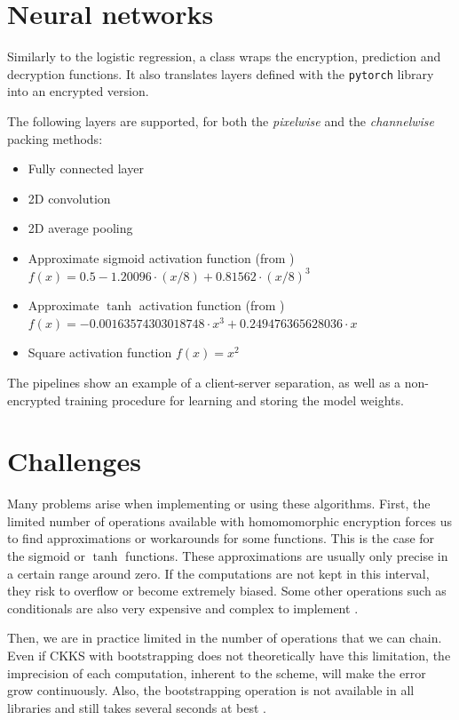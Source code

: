 \documentclass[a4paper,11pt,oneside]{report}
\begin{document}
\section{Neural networks}

Similarly to the logistic regression, a class wraps the encryption, prediction and decryption functions. 
It also translates layers defined with the \texttt{pytorch} library into an encrypted version.

The following layers are supported, for both the \emph{pixelwise} and the \emph{channelwise} packing methods:
\begin{itemize}
  \item Fully connected layer
  \item 2D convolution
  \item 2D average pooling
  \item Approximate sigmoid activation function (from \cite{kim_logistic_2018}) \\ $f(x) = 0.5 - 1.20096 \cdot (x/8) + 0.81562 \cdot (x/8)^3$ 
  \item Approximate $\tanh$ activation function (from \cite{podschwadt_classification_2020}) \\ $f(x) = -0.00163574303018748 \cdot x^3 + 0.249476365628036 \cdot x$ 
  \item Square activation function $f(x) = x^2$
\end{itemize}

The pipelines show an example of a client-server separation, as well as a non-encrypted training procedure for learning and storing the model weights.


\section{Challenges}

Many problems arise when implementing or using these algorithms. 
First, the limited number of operations available with homomomorphic encryption forces us to find approximations or workarounds for some functions.
This is the case for the sigmoid or $\tanh$ functions.
These approximations are usually only precise in a certain range around zero. 
If the computations are not kept in this interval, they risk to overflow or become extremely biased.
Some other operations such as conditionals are also very expensive and complex to implement \cite{chialva_conditionals_2019}.

Then, we are in practice limited in the number of operations that we can chain. 
Even if CKKS with bootstrapping does not theoretically have this limitation, the imprecision of each computation, inherent to the scheme, will make the error grow continuously.
Also, the bootstrapping operation is not available in all libraries and still takes several seconds at best \cite{bossuat_efficient_2021}.
\end{document}
